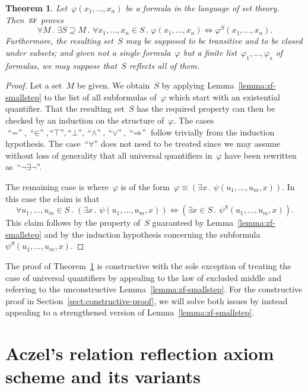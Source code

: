 \documentclass[oneside,reqno]{amsart}
\theoremstyle{definition}
\theoremstyle{plain}
\newtheorem{thm}[defn]{Theorem}
\theoremstyle{remark}
\renewcommand{\_}{\mathpunct{.}\,}
\newcommand{\?}{\,{:}\,}
\newcommand{\ZF}{\textsc{zf}}
\begin{document}
\begin{thm}\label{thm:zf-bigstep}
Let~$\varphi(x_1,\ldots,x_n)$ be a formula in the language of set
theory. Then~$\ZF$ proves
\[ \forall M\_
  \exists S \supseteq M\_
  \forall x_1,\ldots,x_n \in S\_
  \varphi(x_1,\ldots,x_n) \Leftrightarrow \varphi^S(x_1,\ldots,x_n). \]
Furthermore, the
resulting set~$S$ may be supposed to be transitive and to be closed under
subsets; and given not a single formula~$\varphi$ but a finite
list~$\varphi_1,\ldots,\varphi_s$ of formulas, we may suppose that~$S$ reflects
all of them.
\end{thm}

\begin{proof}Let a set~$M$ be given. We obtain~$S$ by applying
Lemma~\ref{lemma:zf-smallstep} to the list of all subformulas of~$\varphi$
which start with an existential quantifier. That
the resulting set~$S$ has the required property can then be checked by an induction on the structure
of~$\varphi$. The cases~$\text{``$=$''}, \text{``$\in$''}, \text{``$\top$''},
\text{``$\bot$''}, \text{``$\wedge$''},
\text{``$\vee$''}, \text{``$\Rightarrow$''}$ follow
trivially from the induction hypothesis. The case~``$\forall$'' does
not need to be treated since we may assume without loss of generality that all
universal quantifiers in~$\varphi$ have been rewritten
as~``$\neg\exists\neg$''.

The remaining case is where~$\varphi$ is of the form~$\varphi \equiv (\exists
x\_ \psi(u_1,\ldots,u_m,x))$. In this case the claim is that
\[ \forall u_1,\ldots,u_m \in S\_
  (\exists x\_ \psi(u_1,\ldots,u_m,x)) \Longleftrightarrow
  (\exists x \in S\_ \psi^S(u_1,\ldots,u_m,x)). \]
This claim follows by the property of~$S$ guaranteed by
Lemma~\ref{lemma:zf-smallstep} and by the induction hypothesis concerning the
subformula~$\psi^S(u_1,\ldots,u_m,x)$.
\end{proof}

The proof of Theorem~\ref{thm:zf-bigstep} is constructive with the sole
exception of treating the case of universal quantifiers by appealing to the law
of excluded middle and referring to the unconstructive Lemma~\ref{lemma:zf-smallstep}. For the constructive proof in
Section~\ref{sect:constructive-proof}, we will solve both issues by instead appealing to a strengthened
version of Lemma~\ref{lemma:zf-smallstep}.


\section{Aczel's relation reflection axiom scheme and its variants}
\label{sect:axioms}
\end{document}
